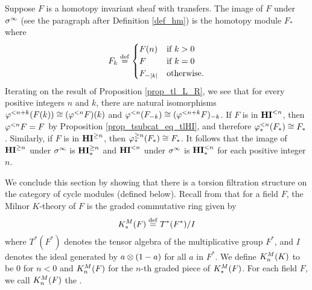 \begin{ex}\label{ex_TFHI_eq_TFHM}
Suppose $F$ is a homotopy invariant sheaf with transfers. The
image of $F$ under $\spectHI$ (see the paragraph after
Definition \ref{def_hm}) is the homotopy module $F_*$ where
\[
F_k \defeq \begin{cases}
\LHI[n]{F} & \textrm{if }k > 0\\
F &\textrm{if }k = 0\\
\RHI[|k|]{F} &\textrm{otherwise}.
\end{cases}
\]
Iterating on the result of Proposition 
\ref{prop_tl_L_R}, we see that for every positive integers $n$ and 
$k$, there are natural isomorphisms $\tlHI{n + k}(\LHI[k]{F}) 
\cong \LHI[k]{(\tlHI{n}F)}$ and $\tlHI{n}(\RHI[k]{F}) \cong 
\RHI[k]{(\tlHI{n + k}F)}$. If $F$ is in $\TFHI{n}$, then $\tlHI{n}F 
= F$ by Proposition \ref{prop_tsubcat_eq_tlHI}, and therefore
$\tlHM{n}(F_*) \cong F_*$. Similarly, if $F$ is in $\THI{n}$,
then $\tgHM{n}(F_*) \cong F_*$. It follows that the image of
$\THI{n}$ under $\spectHI$ is $\THM{n}$ and $\TFHI{n}$ under
$\spectHI$ is $\TFHM{n}$ for each positive integer $n$.
\end{ex}

We conclude this section by showing that there is a torsion 
filtration structure on the category of cycle modules (defined 
below). Recall from \cite{MilK} that for a field $F$, the Milnor 
$K$-theory of $F$ is the graded commutative ring given by
\[
\milK_*(F) \defeq T^*(F^*)/I
\]
where $T^*(F^*)$ denotes the tensor algebra of the multiplicative 
group $F^*$, and $I$ denotes the ideal generated by $a \tensor 
(1 - a)$ for all $a$ in $F^*$. We define $\milK_n(K)$ to be $0$
for $n < 0$ and $\milK_n(F)$ for the $n$-th graded piece of 
$\milK_*(F)$. For each field $F$, we call $\milK_n(F)$ the 
.

